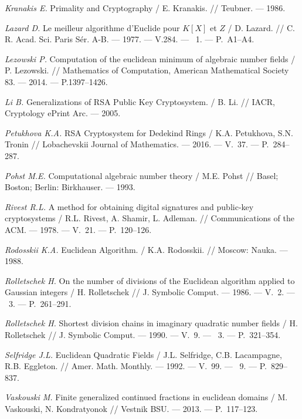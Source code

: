 \begin{thebibliography}{99}
\textit{Kranakis E.} Primality and Cryptography / E. Kranakis. // Teubner. --- 1986.

\textit{Lazard D.} Le meilleur algorithme d'{E}uclide pour {$K[X]$} et {$Z$} / D. Lazard. // C. R. Acad. Sci. Paris S\'er. A-B. --- 1977. --- V.284. --- \textnumero~1. --- P.~A1--A4.

\textit{Lezowski P.} Computation of the euclidean minimum of algebraic number fields / P. Lezowski. // Mathematics of Computation, American Mathematical Society 83. --- 2014. --- P.1397–1426.

\textit{Li B.} Generalizations of RSA Public Key Cryptosystem. / B. Li. // IACR, Cryptology ePrint Arc. --- 2005.

\textit{Petukhova K.A.} RSA Cryptosystem for Dedekind Rings / K.A. Petukhova, S.N. Tronin // Lobachevskii Journal of Mathematics. --- 2016. --- V.~37. --- P.~284--287.

\textit{Pohst M.E.} Computational algebraic number theory / M.E. Pohst // Basel; Boston; Berlin: Birkhauser. --- 1993. 

\textit{Rivest R.L.} A method for obtaining digital signatures and public-key cryptosystems / R.L. Rivest, A. Shamir, L. Adleman. // Communications of the ACM. --- 1978. --- V.~21. --- P.~120--126.

\textit{Rodosskii K.A.} Euclidean Algorithm. / K.A. Rodosskii. // Moscow: Nauka. --- 1988.

\textit{Rolletschek H.} On the number of divisions of the Euclidean algorithm applied to Gaussian integers / H. Rolletschek // J. Symbolic Comput. --- 1986. --- V.~2. --- \textnumero~3. --- P.~261--291.

\textit{Rolletschek H.} Shortest division chains in imaginary quadratic number fields / H. Rolletschek // J. Symbolic Comput. --- 1990. --- V.~9. --- {\textnumero}~3. --- P.~321--354.

\textit{Selfridge J.L.} Euclidean Quadratic Fields / J.L. Selfridge, C.B. Lacampagne, R.B. Eggleton. // Amer. Math. Monthly. --- 1992. --- V.~99. --- {\textnumero}~9. --- P.~829--837.

\textit{Vaskouski M.} Finite generalized continued fractions in euclidean domains / M. Vaskouski, N. Kondratyonok // Vestnik BSU. --- 2013. --- P.~117–123.


\end{thebibliography}
